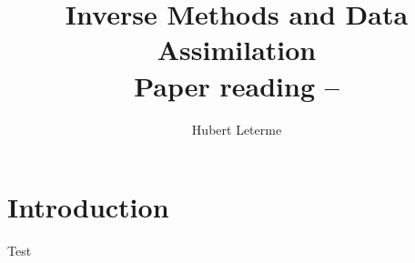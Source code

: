 \documentclass[a4paper,10pt]{article}
\title{Inverse Methods and Data Assimilation\\Paper reading -- \cite{lawless2008}}
\author{Hubert Leterme}
\begin{document}
\maketitle

\section{Introduction}

Test



\end{document}
